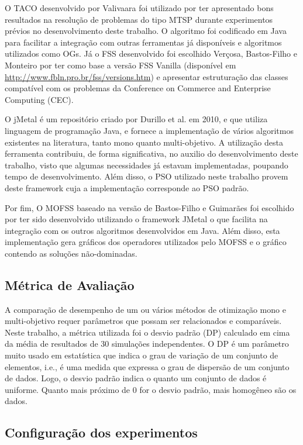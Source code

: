 O TACO desenvolvido por Valivaara foi utilizado por ter apresentado bons resultados na resolução de problemas do tipo MTSP durante experimentos prévios no desenvolvimento deste trabalho. O algoritmo foi codificado em Java para facilitar a integração com outras ferramentas já disponíveis e algoritmos utilizados como OGs. Já o FSS desenvolvido foi escolhido Verçosa, Bastos-Filho e Monteiro por ter como base a versão FSS Vanilla (disponível em \url{http://www.fbln.pro.br/fss/versions.htm}) e apresentar estruturação das classes compatível com os problemas da Conference on Commerce and Enterprise Computing (CEC). 

O jMetal é um repositório criado por Durillo et al. em 2010, e que utiliza linguagem de programação Java, e fornece a implementação de vários algoritmos existentes na literatura, tanto mono quanto multi-objetivo. A utilização desta ferramenta contribuiu, de forma significativa, no auxilio do desenvolvimento deste trabalho, visto que algumas necessidades já estavam implementadas, poupando tempo de desenvolvimento. Além disso, o PSO utilizado neste trabalho provem deste framework cuja a implementação corresponde ao PSO padrão.

Por fim, O MOFSS baseado na versão de Bastos-Filho e Guimarães foi escolhido por ter sido desenvolvido utilizando o framework JMetal o que facilita na integração com os outros algoritmos desenvolvidos em Java. Além disso, esta implementação gera gráficos dos operadores utilizados pelo MOFSS e o gráfico contendo as soluções não-dominadas.

\subsection{Métrica de Avaliação}
\label{sec-metodologia-experimento}

A comparação de desempenho de um ou vários métodos de otimização mono e multi-objetivo requer parâmetros que possam ser relacionados e comparáveis. Neste trabalho, a métrica utilizada foi o desvio padrão (DP) calculado em cima da média de resultados de 30 simulações independentes. O DP é um parâmetro muito usado em estatística que indica o grau de variação de um conjunto de elementos, i.e., é uma medida que expressa o grau de dispersão de um conjunto de dados. Logo, o desvio padrão indica o quanto um conjunto de dados é uniforme. Quanto mais próximo de 0 for o desvio padrão, mais homogêneo são os dados.

\subsection{Configuração dos experimentos}
\label{sec-metodologia-config}

